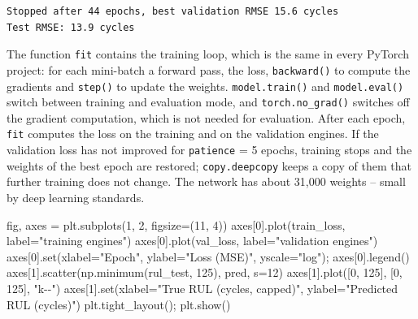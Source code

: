 \documentclass[
  letterpaper,
  DIV=11,
  numbers=noendperiod]{scrreprt}
\newenvironment{Shaded}{\begin{snugshade}}{\end{snugshade}}
\newcommand{\BuiltInTok}[1]{\textcolor[rgb]{0.00,0.23,0.31}{#1}}
\newcommand{\DecValTok}[1]{\textcolor[rgb]{0.68,0.00,0.00}{#1}}
\newcommand{\NormalTok}[1]{\textcolor[rgb]{0.00,0.23,0.31}{#1}}
\newcommand{\OperatorTok}[1]{\textcolor[rgb]{0.37,0.37,0.37}{#1}}
\newcommand{\StringTok}[1]{\textcolor[rgb]{0.13,0.47,0.30}{#1}}
\begin{document}
\begin{verbatim}
Stopped after 44 epochs, best validation RMSE 15.6 cycles
Test RMSE: 13.9 cycles
\end{verbatim}

The function \texttt{fit} contains the training loop, which is the same
in every PyTorch project: for each mini-batch a forward pass, the loss,
\texttt{backward()} to compute the gradients and \texttt{step()} to
update the weights. \texttt{model.train()} and \texttt{model.eval()}
switch between training and evaluation mode, and
\texttt{torch.no\_grad()} switches off the gradient computation, which
is not needed for evaluation. After each epoch, \texttt{fit} computes
the loss on the training and on the validation engines. If the
validation loss has not improved for \texttt{patience} = 5 epochs,
training stops and the weights of the best epoch are restored;
\texttt{copy.deepcopy} keeps a copy of them that further training does
not change. The network has about 31,000 weights -- small by deep
learning standards.

\begin{Shaded}
\begin{Highlighting}[]
\NormalTok{fig, axes }\OperatorTok{=}\NormalTok{ plt.subplots(}\DecValTok{1}\NormalTok{, }\DecValTok{2}\NormalTok{, figsize}\OperatorTok{=}\NormalTok{(}\DecValTok{11}\NormalTok{, }\DecValTok{4}\NormalTok{))}
\NormalTok{axes[}\DecValTok{0}\NormalTok{].plot(train\_loss, label}\OperatorTok{=}\StringTok{"training engines"}\NormalTok{)}
\NormalTok{axes[}\DecValTok{0}\NormalTok{].plot(val\_loss, label}\OperatorTok{=}\StringTok{"validation engines"}\NormalTok{)}
\NormalTok{axes[}\DecValTok{0}\NormalTok{].}\BuiltInTok{set}\NormalTok{(xlabel}\OperatorTok{=}\StringTok{"Epoch"}\NormalTok{, ylabel}\OperatorTok{=}\StringTok{"Loss (MSE)"}\NormalTok{, yscale}\OperatorTok{=}\StringTok{"log"}\NormalTok{)}\OperatorTok{;}\NormalTok{ axes[}\DecValTok{0}\NormalTok{].legend()}
\NormalTok{axes[}\DecValTok{1}\NormalTok{].scatter(np.minimum(rul\_test, }\DecValTok{125}\NormalTok{), pred, s}\OperatorTok{=}\DecValTok{12}\NormalTok{)}
\NormalTok{axes[}\DecValTok{1}\NormalTok{].plot([}\DecValTok{0}\NormalTok{, }\DecValTok{125}\NormalTok{], [}\DecValTok{0}\NormalTok{, }\DecValTok{125}\NormalTok{], }\StringTok{"k{-}{-}"}\NormalTok{)}
\NormalTok{axes[}\DecValTok{1}\NormalTok{].}\BuiltInTok{set}\NormalTok{(xlabel}\OperatorTok{=}\StringTok{"True RUL (cycles, capped)"}\NormalTok{, ylabel}\OperatorTok{=}\StringTok{"Predicted RUL (cycles)"}\NormalTok{)}
\NormalTok{plt.tight\_layout()}\OperatorTok{;}\NormalTok{ plt.show()}
\end{Highlighting}
\end{Shaded}
\end{document}
